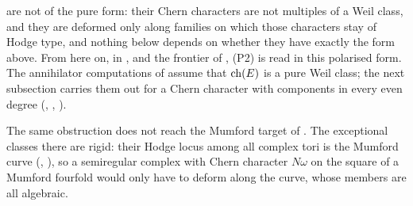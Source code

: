 \begin{remark}
\cite{Mar25a,Mar25b} are not of the pure form: their Chern characters are not
multiples of a Weil class, and they are deformed only along families on which
those characters stay of Hodge type, and nothing below depends on whether
they have exactly the form above. From here on, in
\cite[Corollary~2.71]{paperIII}, \cite[Theorem~2.70]{paperIII} and the frontier of
\cite[Section~2]{paperIII}, \textup{(P2)} is read in this polarised form. The
annihilator computations of \cite[Section~16]{paperI} assume that $\operatorname{ch}(E)$ is a
pure Weil class; the next subsection carries them out for a Chern character
with components in every even degree (,
, ).

The same obstruction does not reach the Mumford target of
\cite[Section~3.2]{paperIII}. The exceptional classes there are rigid: their Hodge
locus among all complex tori is the Mumford curve (\cite[Theorem~3.21]{paperIII},
\cite[Proposition~3.24]{paperIII}), so a semiregular complex with Chern character
$N\omega$ on the square of a Mumford fourfold would only have to deform along
the curve, whose members are all algebraic.
\end{remark}

